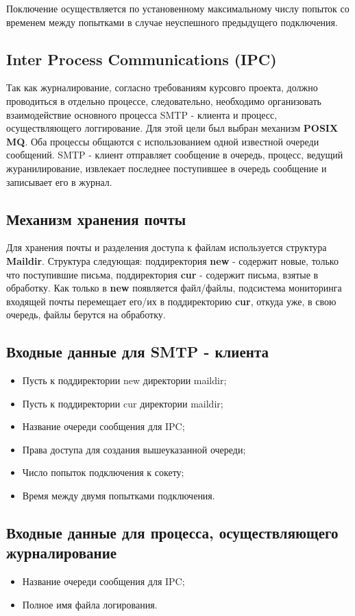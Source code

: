 \documentclass[a4paper,12pt]{article}
\begin{document}
Поключение осуществляется по установенному максимальному числу попыток со временем между попытками в случае неуспешного предыдущего подключения.


\subsection{Inter Process Communications (IPC)}
Так как журналирование, согласно требованиям курсовго проекта, должно проводиться в отдельно процессе, следовательно,
необходимо организовать взаимодействие основного процесса SMTP - клиента и процесс, осуществляющего логгирование.
Для этой цели был выбран механизм \textbf{POSIX MQ}.
Оба процессы общаются с использованием одной известной очереди сообщений. SMTP - клиент отправляет сообщение в очередь, процесс, ведущий журанилирование,
извлекает последнее поступившее в очередь сообщение и записывает его в журнал.

\subsection{Механизм хранения почты}
Для хранения почты и разделения доступа к файлам используется структура \textbf{Maildir}. Структура следующая: поддиректория \textbf{new} - содержит новые, только что поступившие письма, поддиректория \textbf{cur} - содержит письма, взятые в обработку.
Как только в \textbf{new} появляется файл/файлы, подсистема мониторинга входящей почты перемещает его/их в поддиректорию \textbf{cur}, откуда уже, в свою очередь, файлы берутся на обработку.

\subsection{Входные данные для SMTP - клиента}
\begin{itemize}
\item Пусть к поддиректории new директории maildir;
\item Пусть к поддиректории cur директории maildir;
\item Название очереди сообщения для IPC;
\item Права доступа для создания вышеуказанной очереди;
\item Число попыток подключения к сокету;
\item Время между двумя попытками подключения.
\end{itemize}

\subsection{Входные данные для процесса, осуществляющего журналирование}
\begin{itemize}
\item Название очереди сообщения для IPC;
\item Полное имя файла логирования.
\end{itemize}
\end{document}

